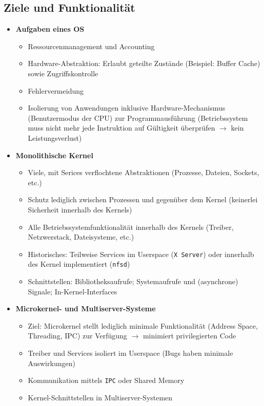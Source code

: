 \subsection{Ziele und Funktionalität}
\begin{itemize}
	\item \textbf{Aufgaben eines OS}
	\begin{itemize}
		\item Ressourcenmanagement und Accounting
		\item Hardware-Abstraktion: Erlaubt geteilte Zustände (Beispiel: Buffer Cache) sowie Zugriffskontrolle
		\item Fehlervermeidung
		\item Isolierung von Anwendungen inklusive Hardware-Mechanismus (Benutzermodus der CPU) zur Programmausführung (Betriebssystem muss nicht mehr jede Instruktion auf Gültigkeit überprüfen \(\rightarrow\) kein Leistungsverlust)
	\end{itemize}
	\item \textbf{Monolithische Kernel}
	\begin{itemize}
		\item Viele, mit Serices verflochtene Abstraktionen (Prozesse, Dateien, Sockets, etc.)
		\item Schutz lediglich zwischen Prozessen und gegenüber dem Kernel (keinerlei Sicherheit innerhalb des Kernels)
		\item Alle Betriebssystemfunktionalität innerhalb des Kernels (Treiber, Netzwerstack, Dateisysteme, etc.)
		\item Historisches: Teilweise Services im Userspace (\texttt{X Server}) oder innerhalb des Kernel implementiert (\texttt{nfsd})
		\item Schnittstellen: Bibliotheksaufrufe; Systemaufrufe und (asynchrone) Signale; In-Kernel-Interfaces
	\end{itemize}
	\item \textbf{Microkernel- und Multiserver-Systeme}
	\begin{itemize}
		\item Ziel: Microkernel stellt lediglich minimale Funktionalität (Address Space, Threading, IPC) zur Verfügung \(\rightarrow\) minimiert privilegierten Code
		\item Treiber und Services isoliert im Userspace (Bugs haben minimale Auswirkungen)
		\item Kommunikation mittels \texttt{IPC} oder Shared Memory
		\item Kernel-Schnittstellen in Multiserver-Systemen

\end{itemize}
\end{itemize}
